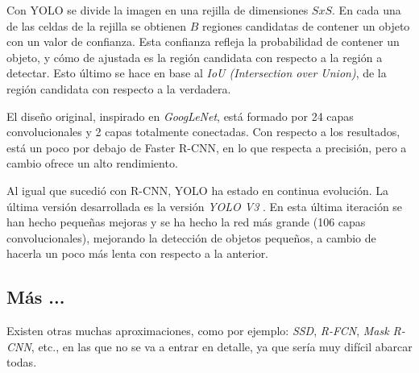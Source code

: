 Con YOLO se divide la imagen en una rejilla de dimensiones $SxS$. En cada una de las celdas de la rejilla se obtienen $B$ regiones candidatas de contener un objeto con un valor de confianza. Esta confianza refleja la probabilidad de contener un objeto, y cómo de ajustada es la región candidata con respecto a la región a detectar. Esto último se hace en base al \textit{IoU (Intersection over Union)}, de la región candidata con respecto a la verdadera.

El diseño original, inspirado en \textit{GoogLeNet}, está formado por 24 capas convolucionales y 2 capas totalmente conectadas. Con respecto a los resultados, está un poco por debajo de Faster R-CNN, en lo que respecta a precisión, pero a cambio ofrece un alto rendimiento.

Al igual que sucedió con R-CNN, YOLO ha estado en continua evolución. La última versión desarrollada es la versión \textit{YOLO V3} \cite{s2_stateofart_yolov3}. En esta última iteración se han hecho pequeñas mejoras y se ha hecho la red más grande (106 capas convolucionales), mejorando la detección de objetos pequeños, a cambio de hacerla un poco más lenta con respecto a la anterior.

\subsection*{Más ...}

Existen otras muchas aproximaciones, como por ejemplo: \textit{SSD}, \textit{R-FCN}, \textit{Mask R-CNN}, etc., en las que no se va a entrar en detalle, ya que sería muy difícil abarcar todas.